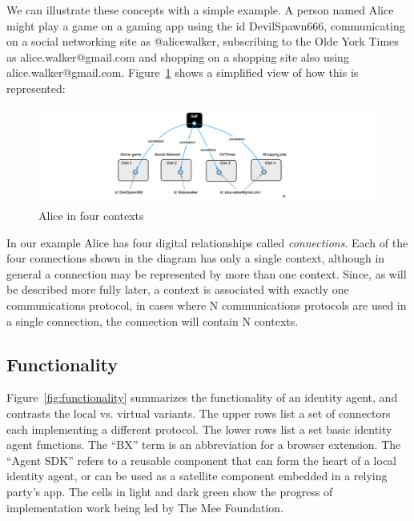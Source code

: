 \documentclass[11pt, oneside]{article}   	%
\begin{document}
We can illustrate these concepts with a simple example. A person named Alice might play a game on a gaming app using the id DevilSpawn666, communicating on a social networking site as @alicewalker, subscribing to the Olde York Times as alice.walker@gmail.com and shopping on a shopping site also using alice.walker@gmail.com. Figure~\ref{fig:four-contexts} shows a simplified view of how this is represented:

\begin{figure}[htbp]
\includegraphics[width=\textwidth]{./images/example1.png}
\caption{Alice in four contexts}
\label{fig:four-contexts}
\end{figure}

In our example Alice has four digital relationships called \emph{connections}. Each of the four connections shown in the diagram has only a single context, although in general a connection may be represented by more than one context. Since, as will be described more fully later, a context is associated with exactly one communications protocol, in cases where N communications protocols are used in a single connection, the connection will contain N contexts. 

\subsection{Functionality}

Figure~\ref{fig:functionality} summarizes the functionality of an identity agent, and contrasts the local vs. virtual variants. The upper rows list a set of connectors each implementing a different protocol. The lower rows list a set basic identity agent functions. The ``BX'' term is an abbreviation for a browser extension. The ``Agent SDK'' refers to a reusable component that can form the heart of a local identity agent, or can be used as a satellite component embedded in a relying party's app. The cells in light and dark green show the progress of implementation work being led by The Mee Foundation. 
\end{document}
